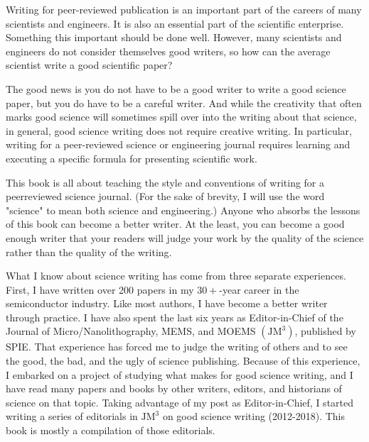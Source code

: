 
Writing for peer-reviewed publication is an important part of the careers of many scientists and engineers. It is also an essential part of the scientific enterprise. Something this important should be done well. However, many scientists and engineers do not consider themselves good writers, so how can the average scientist write a good scientific paper?

The good news is you do not have to be a good writer to write a good science paper, but you do have to be a careful writer. And while the creativity that often marks good science will sometimes spill over into the writing about that science, in general, good science writing does not require creative writing. In particular, writing for a peer-reviewed science or engineering journal requires learning and executing a specific formula for presenting scientific work.

This book is all about teaching the style and conventions of writing for a peerreviewed science journal. (For the sake of brevity, I will use the word "science" to mean both science and engineering.) Anyone who absorbs the lessons of this book can become a better writer. At the least, you can become a good enough writer that your readers will judge your work by the quality of the science rather than the quality of the writing.

What I know about science writing has come from three separate experiences. First, I have written over 200 papers in my $30+$-year career in the semiconductor industry. Like most authors, I have become a better writer through practice. I have also spent the last six years as Editor-in-Chief of the Journal of Micro/Nanolithography, MEMS, and MOEMS $\left(\mathrm{JM}^{3}\right)$, published by SPIE. That experience has forced me to judge the writing of others and to see the good, the bad, and the ugly of science publishing. Because of this experience, I embarked on a project of studying what makes for good science writing, and I have read many papers and books by other writers, editors, and historians of science on that topic. Taking advantage of my post as Editor-in-Chief, I started writing a series of editorials in $\mathrm{JM}^{3}$ on good science writing (2012-2018). This book is mostly a compilation of those editorials.

